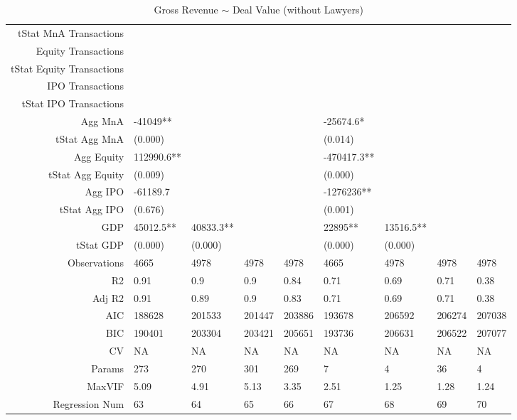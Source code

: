\begin{table}[ht]
\begin{tabular}{rllllllll}
  tStat MnA Transactions &  &  &  &  &  &  &  &  \\ 
  Equity Transactions &  &  &  &  &  &  &  &  \\ 
  tStat Equity Transactions &  &  &  &  &  &  &  &  \\ 
  IPO Transactions &  &  &  &  &  &  &  &  \\ 
  tStat IPO Transactions &  &  &  &  &  &  &  &  \\ 
  Agg MnA & -41049** &  &  &  & -25674.6* &  &  &  \\ 
  tStat Agg MnA & (0.000) &  &  &  & (0.014) &  &  &  \\ 
  Agg Equity & 112990.6** &  &  &  & -470417.3** &  &  &  \\ 
  tStat Agg Equity & (0.009) &  &  &  & (0.000) &  &  &  \\ 
  Agg IPO & -61189.7 &  &  &  & -1276236** &  &  &  \\ 
  tStat Agg IPO & (0.676) &  &  &  & (0.001) &  &  &  \\ 
  GDP & 45012.5** & 40833.3** &  &  & 22895** & 13516.5** &  &  \\ 
  tStat GDP & (0.000) & (0.000) &  &  & (0.000) & (0.000) &  &  \\ 
  Observations & 4665 & 4978 & 4978 & 4978 & 4665 & 4978 & 4978 & 4978 \\ 
  R2 & 0.91 & 0.9 & 0.9 & 0.84 & 0.71 & 0.69 & 0.71 & 0.38 \\ 
  Adj R2 & 0.91 & 0.89 & 0.9 & 0.83 & 0.71 & 0.69 & 0.71 & 0.38 \\ 
  AIC & 188628 & 201533 & 201447 & 203886 & 193678 & 206592 & 206274 & 207038 \\ 
  BIC & 190401 & 203304 & 203421 & 205651 & 193736 & 206631 & 206522 & 207077 \\ 
  CV & NA & NA & NA & NA & NA & NA & NA & NA \\ 
  Params & 273 & 270 & 301 & 269 & 7 & 4 & 36 & 4 \\ 
  MaxVIF & 5.09 & 4.91 & 5.13 & 3.35 & 2.51 & 1.25 & 1.28 & 1.24 \\ 
  Regression Num & 63 & 64 & 65 & 66 & 67 & 68 & 69 & 70 \\ 
   \hline
\end{tabular}
\caption{Gross Revenue $\sim$ Deal Value (without Lawyers)} 
\end{table}
